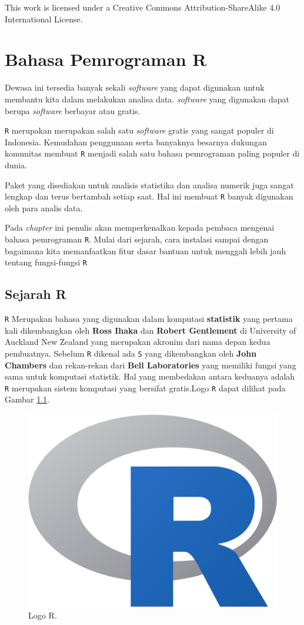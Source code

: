 \documentclass[
]{book}
\theoremstyle{definition}
\theoremstyle{definition}
\theoremstyle{definition}
\theoremstyle{definition}
\theoremstyle{remark}
\begin{document}
This
work is licensed under a
Creative
Commons Attribution-ShareAlike 4.0 International License.

\hypertarget{intro}{%
\chapter{Bahasa Pemrograman R}\label{intro}}

Dewasa ini tersedia banyak sekali \emph{software} yang dapat digunakan untuk membantu kita dalam melakukan analisa data. \emph{software} yang digunakan dapat berupa \emph{software} berbayar atau gratis.

\texttt{R} merupakan merupakan salah satu \emph{software} gratis yang sangat populer di Indonesia. Kemudahan penggunaan serta banyaknya besarnya dukungan komunitas membuat \texttt{R} menjadi salah satu bahasa pemrograman paling populer di dunia.

Paket yang disediakan untuk analisis statistika dan analisa numerik juga sangat lengkap dan terus bertambah setiap saat. Hal ini membuat \texttt{R} banyak digunakan oleh para analis data.

Pada \emph{chapter} ini penulis akan memperkenalkan kepada pembaca mengenai bahasa pemrograman \texttt{R}. Mulai dari sejarah, cara instalasi sampai dengan bagaimana kita memanfaatkan fitur dasar bantuan untuk menggali lebih jauh tentang fungsi-fungsi \texttt{R}

\hypertarget{sejarahR}{%
\section{Sejarah R}\label{sejarahR}}

\texttt{R} Merupakan bahasa yang digunakan dalam komputasi \textbf{statistik} yang pertama kali dikembangkan oleh \textbf{Ross Ihaka} dan \textbf{Robert Gentlement} di University of Auckland New Zealand yang merupakan akronim dari nama depan kedua pembuatnya. Sebelum \texttt{R} dikenal ada \texttt{S} yang dikembangkan oleh \textbf{John Chambers} dan rekan-rekan dari \textbf{Bell Laboratories} yang memiliki fungsi yang sama untuk komputasi statistik. Hal yang membedakan antara keduanya adalah \texttt{R} merupakan sistem komputasi yang bersifat gratis.Logo \texttt{R} dapat dilihat pada Gambar \ref{fig:Logo}.

\begin{figure}

{\centering \includegraphics[width=0.4\linewidth]{./images/r-icon} 

}

\caption{Logo R.}\label{fig:Logo}
\end{figure}
\end{document}
